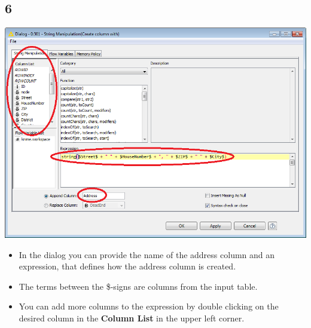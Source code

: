 \documentclass{beamer}
\begin{document}
\subsection{6}
\begin{frame}
	\begin{center}
  		\includegraphics[height=0.5\textheight]{6.png}
	\end{center}
	\begin{itemize}
		\item In the dialog you can provide the name of the address column and an expression, that defines how the address column is created.
		\item The terms between the \$-signs are columns from the input table.
		\item You can add more columns to the expression by double clicking on the desired column in the \textbf{Column List} in the upper left corner.
	\end{itemize}
\end{frame}
\end{document}
